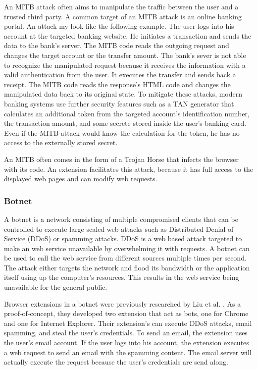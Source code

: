 	An MITB attack often aims to manipulate the traffic between the user and a trusted third party. A common target of an MITB attack is an online banking portal. An attack my look like the following example. The user logs into his account at the targeted banking website. He initiates a transaction and sends the data to the bank's server. The MITB code reads the outgoing request and changes the target account or the transfer amount. The bank's sever is not able to recognize the manipulated request because it receives the information with a valid authentication from the user. It executes the transfer and sends back a receipt. The MITB code reads the response's HTML code and changes the manipulated data back to its original state. To mitigate these attacks, modern banking systems use further security features such as a TAN generator that calculates an additional token from the targeted account's identification number, the transaction amount, and some secrete stored inside the user's banking card. Even if the MITB attack would know the calculation for the token, he has no access to the externally stored secret.
	 
	An MITB often comes in the form of a Trojan Horse that infects the browser with its code. An extension facilitates this attack, because it has full access to the displayed web pages and can modify web requests. 
	
\subsubsection{Botnet}

	A botnet is a network consisting of multiple compromised clients that can be controlled to execute large scaled web attacks such as Distributed Denial of Service (DDoS) or spamming attacks. DDoS is a web based attack targeted to make an web service unavailable by overwhelming it with requests. A botnet can be used to call the web service from different sources multiple times per second. The attack either targets the network and flood its bandwidth or the application itself using up the computer's resources. This results in the web service being unavailable for the general public. \cite{liu2011botnet}
	
	Browser extensions in a botnet were previously researched by Liu et al. \cite{liu2011botnet}. As a proof-of-concept, they developed two extension that act as bots, one for Chrome and one for Internet Explorer. Their extension's can execute DDoS attacks, email spamming, and steal the user's credentials. To send an email, the extension uses the user's email account. If the user logs into his account, the extension executes a web request to send an email with the spamming content. The email server will actually execute the request because the user's credentials are send along. 
	
